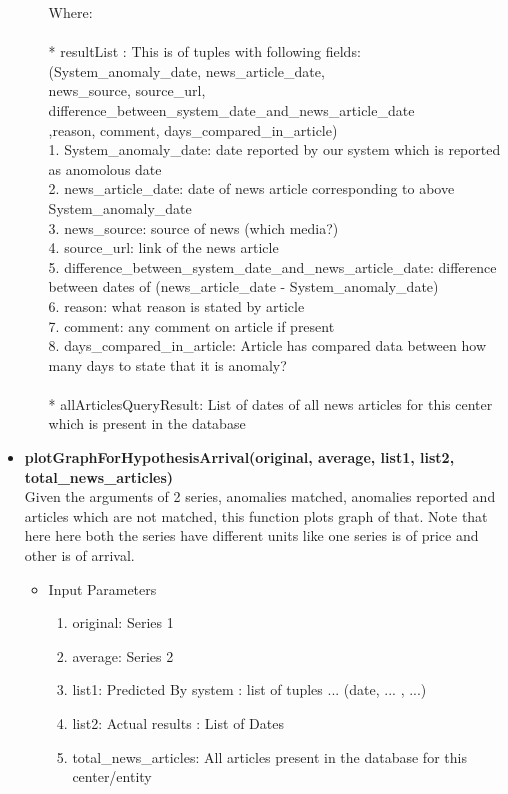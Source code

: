 \begin{itemize}
\begin{itemize}
Where:\\
\\
* resultList : This is of tuples with following fields:\\
				(System\_anomaly\_date, news\_article\_date, \\news\_source, source\_url, difference\_between\_system\_date\_and\_news\_article\_date \\,reason, comment, days\_compared\_in\_article)\\
				1. System\_anomaly\_date: date reported by our system which is reported as anomolous date\\
				2. news\_article\_date: date of news article corresponding to above System\_anomaly\_date\\
				3. news\_source: source of news (which media?)\\
				4. source\_url: link of the news article\\
				5. difference\_between\_system\_date\_and\_news\_article\_date: difference between dates of (news\_article\_date - System\_anomaly\_date)\\
				6. reason: what reason is stated by article\\
				7. comment: any comment on article if present\\
				8. days\_compared\_in\_article: Article has compared data between how many days to state that it is anomaly?\\
				\\
* allArticlesQueryResult: List of dates of all news articles for this center which is present in the database
 \end{itemize}
 


 \item \textbf{plotGraphForHypothesisArrival(original, average, list1, list2, total\_news\_articles)} \\
  
 Given the arguments of 2 series, anomalies matched, anomalies reported and articles which are not matched, this function plots graph of that. Note that here here both the series have different units like one series is of price and other is of arrival.
 
 \begin{itemize}
 \item Input Parameters
 
 \begin{enumerate}
  \item original: Series 1
  \item average: Series 2
  \item list1: Predicted By system : list of tuples ... (date, ... , ...)
  \item list2: Actual results : List of Dates
  \item total\_news\_articles: All articles present in the database for this center/entity
 \end{enumerate}


\end{itemize}
\end{itemize}
